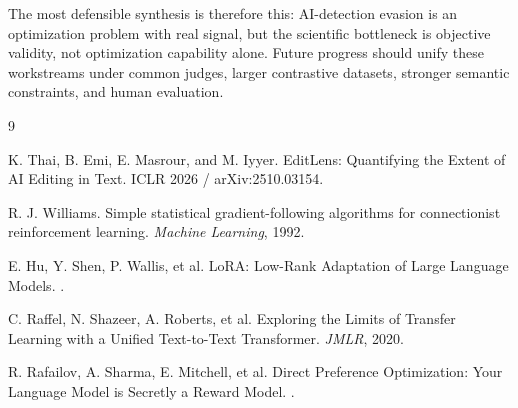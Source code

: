 \documentclass[11pt]{article}
\begin{document}
The most defensible synthesis is therefore this: AI-detection evasion is an optimization problem with real signal, but the scientific bottleneck is objective validity, not optimization capability alone. Future progress should unify these workstreams under common judges, larger contrastive datasets, stronger semantic constraints, and human evaluation.

\begin{thebibliography}{9}

K. Thai, B. Emi, E. Masrour, and M. Iyyer.
\newblock EditLens: Quantifying the Extent of AI Editing in Text.
\newblock ICLR 2026 / arXiv:2510.03154.

R. J. Williams.
\newblock Simple statistical gradient-following algorithms for connectionist reinforcement learning.
\newblock \emph{Machine Learning}, 1992.

E. Hu, Y. Shen, P. Wallis, et al.
\newblock LoRA: Low-Rank Adaptation of Large Language Models.
.

C. Raffel, N. Shazeer, A. Roberts, et al.
\newblock Exploring the Limits of Transfer Learning with a Unified Text-to-Text Transformer.
\newblock \emph{JMLR}, 2020.

R. Rafailov, A. Sharma, E. Mitchell, et al.
\newblock Direct Preference Optimization: Your Language Model is Secretly a Reward Model.
.

\end{thebibliography}
\end{document}

